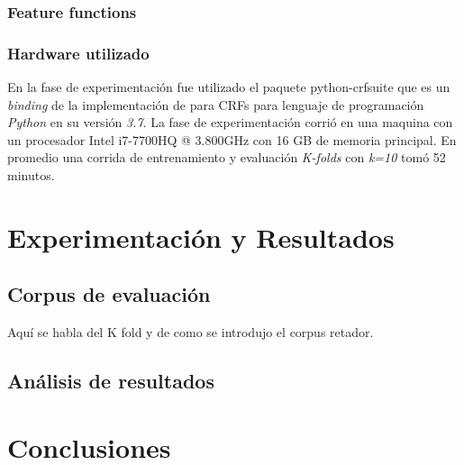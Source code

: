 \documentclass[letterpaper,12pt,oneside]{book}
\begin{document}

	
	\subsection{Feature functions}

	
	\subsection{Hardware utilizado}

	
	En la fase de experimentación fue utilizado el paquete \textsf{python-crfsuite} que es un \textit{binding} de la implementación de \citet{CRFsuite} para CRFs para lenguaje de programación \textit{Python} en su versión \textit{3.7}. La fase de experimentación corrió en una maquina con un procesador \textsf{Intel i7-7700HQ @ 3.800GHz} con \textsf{16 GB} de memoria principal. En promedio una corrida de entrenamiento y evaluación \textit{K-folds} con \textit{k=10} tomó 52 minutos.

	
	\chapter{Experimentación y Resultados}

	
	







	
	\section{Corpus de evaluación}

	
	Aquí se habla del K fold y de como se introdujo el corpus retador.

	
	\section{Análisis de resultados}

	
	\chapter{Conclusiones}

	
	

	
\end{document}
